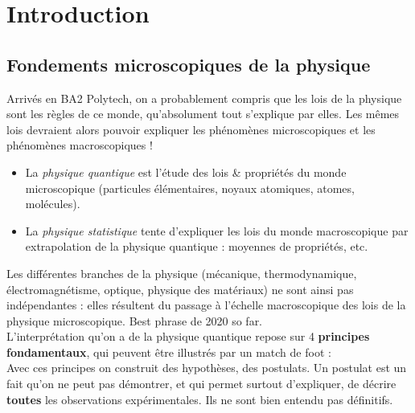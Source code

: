 \documentclass[11pt]{book}
\author{Sami \textsc{Abdul Sater}}
\date{\hspace{-0.6cm}Année académique 2019-2020}
\begin{document}

\tableofcontents
\chapter{Introduction}\setcounter{page}{1}
\section{Fondements microscopiques de la physique}
Arrivés en BA2 Polytech, on a probablement compris que les lois de la physique sont les règles de ce monde, qu'absolument tout s'explique par elles. Les mêmes lois devraient alors pouvoir expliquer les phénomènes microscopiques et les phénomènes macroscopiques ! \\

\begin{itemize}
\item La \textit{physique quantique} est l'étude des lois \& propriétés du monde microscopique (particules élémentaires, noyaux atomiques, atomes, molécules).
\item La \textit{physique statistique} tente d'expliquer les lois du monde macroscopique par extrapolation de la physique quantique : moyennes de propriétés, etc. \\
\end{itemize}
Les différentes branches de la physique (mécanique, thermodynamique, électromagnétisme, optique, physique des matériaux) ne sont ainsi pas indépendantes : elles résultent du passage à l'échelle macroscopique des lois de la physique microscopique. Best phrase de 2020 so far. \\

L'interprétation qu'on a de la physique quantique repose sur 4 \textbf{principes fondamentaux}, qui peuvent être illustrés par un match de foot : \\
Avec ces principes on construit des hypothèses, des postulats. Un postulat est un fait qu'on ne peut pas démontrer, et qui permet surtout d'expliquer, de décrire \textbf{toutes} les observations expérimentales. Ils ne sont bien entendu pas définitifs.
\end{document}
